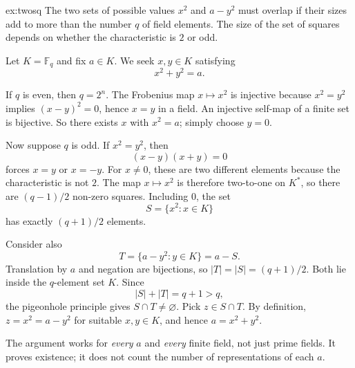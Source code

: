 \begin{solution}{ex:twosq}
\idea The two sets of possible values $x^2$ and $a-y^2$ must overlap if their sizes add to more than the number $q$ of field elements. The size of the set of squares depends on whether the characteristic is $2$ or odd.

\writeup Let $K=\mathbb F_q$ and fix $a\in K$. We seek $x,y\in K$ satisfying
\[
x^2+y^2=a.
\]

If $q$ is even, then $q=2^n$. The Frobenius map $x\mapsto x^2$ is injective because $x^2=y^2$ implies $(x-y)^2=0$, hence $x=y$ in a field. An injective self-map of a finite set is bijective. So there exists $x$ with $x^2=a$; simply choose $y=0$.

Now suppose $q$ is odd. If $x^2=y^2$, then
\[
(x-y)(x+y)=0
\]
forces $x=y$ or $x=-y$. For $x\ne0$, these are two different elements because the characteristic is not $2$. The map $x\mapsto x^2$ is therefore two-to-one on $K^*$, so there are $(q-1)/2$ non-zero squares. Including $0$, the set
\[
S=\{x^2:x\in K\}
\]
has exactly $(q+1)/2$ elements.

Consider also
\[
T=\{a-y^2:y\in K\}=a-S.
\]
Translation by $a$ and negation are bijections, so $|T|=|S|=(q+1)/2$. Both lie inside the $q$-element set $K$. Since
\[
|S|+|T|=q+1>q,
\]
the pigeonhole principle gives $S\cap T\ne\varnothing$. Pick $z\in S\cap T$. By definition, $z=x^2=a-y^2$ for suitable $x,y\in K$, and hence $a=x^2+y^2$.

The argument works for \emph{every} $a$ and \emph{every} finite field, not just prime fields. It proves existence; it does not count the number of representations of each $a$.
\end{solution}

